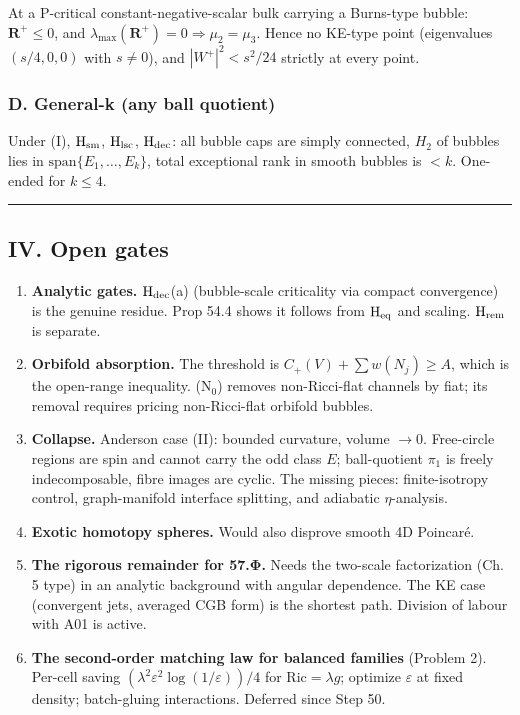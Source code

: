 \documentclass[
  10pt,
]{report}
\begin{document}
At a P-critical constant-negative-scalar bulk carrying a Burns-type
bubble: \(\mathbf R^+\le0\), and
\(\lambda_{\max}(\mathbf R^+)=0\Rightarrow\mu_2=\mu_3\). Hence no
KE-type point (eigenvalues \((s/4,0,0)\) with \(s\ne0\)), and
\(|W^+|^2<s^2/24\) strictly at every point.

\hypertarget{d.-general-k-any-ball-quotient}{%
\subsubsection{D. General-k (any ball
quotient)}\label{d.-general-k-any-ball-quotient}}

Under (I), \(\mathrm H_{\rm sm}\), \(\mathrm H_{\rm lsc}\),
\(\mathrm H_{\rm dec}\): all bubble caps are simply connected, \(H_2\)
of bubbles lies in \(\mathrm{span}\{E_1,\ldots,E_k\}\), total
exceptional rank in smooth bubbles is \(<k\). One-ended for \(k\le4\).

\begin{center}\rule{0.5\linewidth}{0.5pt}\end{center}

\hypertarget{iv.-open-gates}{%
\subsection{IV. Open gates}\label{iv.-open-gates}}

\begin{enumerate}
\def\labelenumi{\arabic{enumi}.}
\item
  \textbf{Analytic gates.} \(\mathrm H_{\rm dec}\)(a) (bubble-scale
  criticality via compact convergence) is the genuine residue. Prop 54.4
  shows it follows from \(\mathrm H_{\rm eq}\) and scaling.
  \(\mathrm H_{\rm rem}\) is separate.
\item
  \textbf{Orbifold absorption.} The threshold is
  \(C_+(V)+\sum w(N_j)\ge A\), which is the open-range inequality.
  (N\(_0\)) removes non-Ricci-flat channels by fiat; its removal
  requires pricing non-Ricci-flat orbifold bubbles.
\item
  \textbf{Collapse.} Anderson case (II): bounded curvature, volume
  \(\to0\). Free-circle regions are spin and cannot carry the odd class
  \(E\); ball-quotient \(\pi_1\) is freely indecomposable, fibre images
  are cyclic. The missing pieces: finite-isotropy control,
  graph-manifold interface splitting, and adiabatic \(\eta\)-analysis.
\item
  \textbf{Exotic homotopy spheres.} Would also disprove smooth 4D
  Poincaré.
\item
  \textbf{The rigorous remainder for 57.Φ.} Needs the two-scale
  factorization (Ch. 5 type) in an analytic background with angular
  dependence. The KE case (convergent jets, averaged CGB form) is the
  shortest path. Division of labour with A01 is active.
\item
  \textbf{The second-order matching law for balanced families} (Problem
  2). Per-cell saving \((\lambda^2\varepsilon^2\log(1/\varepsilon))/4\)
  for \(\mathrm{Ric}=\lambda g\); optimize \(\varepsilon\) at fixed
  density; batch-gluing interactions. Deferred since Step 50.
\end{enumerate}
\end{document}
